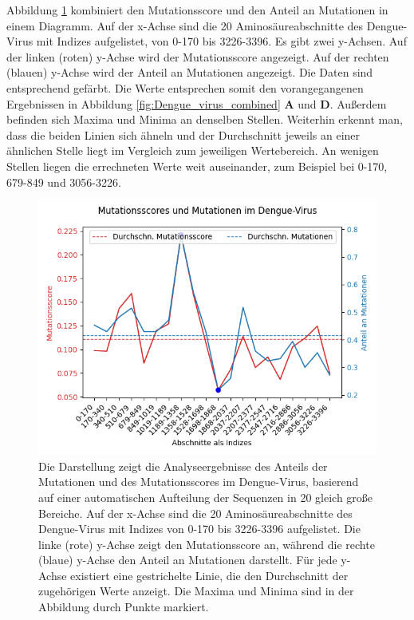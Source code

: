 \documentclass[german,version-2022-01]{uzl-thesis}
\begin{document}
Abbildung \ref{fig:Dengue_virus_scores_and_mutations_bereiche} kombiniert den Mutationsscore und den Anteil an Mutationen in einem Diagramm. Auf der x-Achse sind die 20 Aminos\"aureabschnitte des Dengue-Virus mit Indizes aufgelistet, von 0-170 bis 3226-3396. Es gibt zwei y-Achsen. Auf der linken (roten) y-Achse wird der Mutationsscore angezeigt. Auf der rechten (blauen) y-Achse wird der Anteil an Mutationen angezeigt. Die Daten sind entsprechend gef\"arbt. Die Werte entsprechen somit den vorangegangenen Ergebnissen in Abbildung \ref{fig:Dengue_virus_combined} \textbf{A} und \textbf{D}. Au\ss{}erdem befinden sich Maxima und Minima an denselben Stellen. Weiterhin erkennt man, dass die beiden Linien sich \"ahneln und der Durchschnitt jeweils an einer \"ahnlichen Stelle liegt im Vergleich zum jeweiligen Wertebereich. An wenigen Stellen liegen die errechneten Werte weit auseinander, zum Beispiel bei 0-170, 679-849 und 3056-3226.
\begin{figure}[tbp]
  \centering
  \includegraphics[scale=0.65]{Images/Diagramm_Scores_und_Mutationen_Dengue_viren_Bereiche.png}
  \caption{Die Darstellung zeigt die Analyseergebnisse des Anteils der Mutationen und des Mutationsscores im Dengue-Virus, basierend auf einer automatischen Aufteilung der Sequenzen in 20 gleich gro\ss{}e Bereiche. Auf der x-Achse sind die 20 Aminos\"aureabschnitte des Dengue-Virus mit Indizes von 0-170 bis 3226-3396 aufgelistet. Die linke (rote) y-Achse zeigt den Mutationsscore an, w\"ahrend die rechte (blaue) y-Achse den Anteil an Mutationen darstellt. F\"ur jede y-Achse existiert eine gestrichelte Linie, die den Durchschnitt der zugeh\"origen Werte anzeigt. Die Maxima und Minima sind in der Abbildung durch Punkte markiert.}
  \label{fig:Dengue_virus_scores_and_mutations_bereiche} 
\end{figure}
\end{document}
